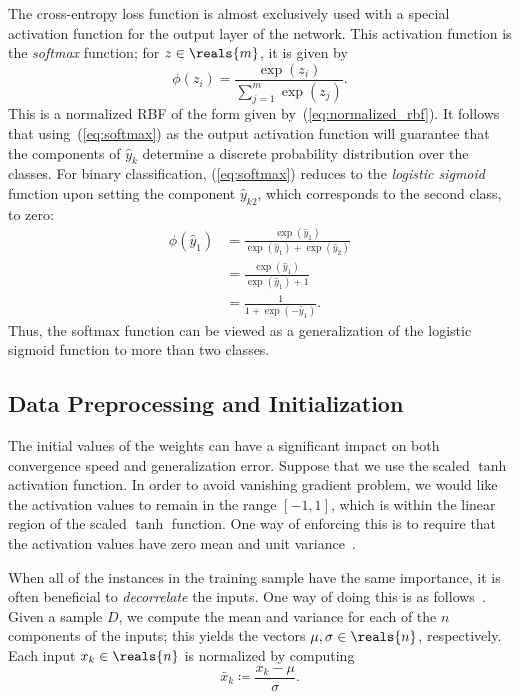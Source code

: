 \documentclass[11pt,a4paper]{article}
\numberwithin{equation}{section}
\begin{document}
The cross-entropy loss function is almost exclusively used with a special
activation function for the output layer of the network. This activation
function is the \emph{softmax} function; for $z \in \reals{m}$, it is given by
\begin{equation}
	\phi(z_i) = \frac{\exp(z_i)}{\sum_{j = 1}^m \exp(z_j)}.
	\label{eq:softmax}
\end{equation}
This is a normalized RBF of the form given by~(\ref{eq:normalized_rbf}). It
follows that using~(\ref{eq:softmax}) as the output activation function will
guarantee that the components of $\hat{y}_k$ determine a discrete probability
distribution over the classes. For binary classification, (\ref{eq:softmax})
reduces to the \emph{logistic sigmoid} function upon setting the component
$\hat{y}_{k2}$, which corresponds to the second class, to zero:
\begin{align*}
	\phi(\hat{y}_1)
	&= \frac{\exp(\hat{y}_1)}{\exp(\hat{y}_1) + \exp(\hat{y}_2)} \\
	&= \frac{\exp(\hat{y}_1)}{\exp(\hat{y}_1) + 1} \\
	&= \frac{1}{1 + \exp(-\hat{y}_1)}.
\end{align*}
Thus, the softmax function can be viewed as a generalization of the logistic
sigmoid function to more than two classes.

\subsection{Data Preprocessing and Initialization}

The initial values of the weights can have a significant impact on both
convergence speed and generalization error. Suppose that we use the scaled
$\tanh$ activation function. In order to avoid vanishing gradient problem, we
would like the activation values to remain in the range $[-1, 1]$, which is
within the linear region of the scaled $\tanh$ function. One way of enforcing
this is to require that the activation values have zero mean and unit
variance~\citep{lecun-98b}.

When all of the instances in the training sample have the same importance, it is
often beneficial to \emph{decorrelate} the inputs. One way of doing this is as
follows~\citep{lecun-98b}. Given a sample $D$, we compute the mean and variance
for each of the $n$ components of the inputs; this yields the vectors $\mu,
\sigma \in \reals{n}$, respectively. Each input $x_k \in \reals{n}$ is
normalized by computing
\[
	\bar{x}_k \coloneqq \frac{x_k - \mu}{\sigma}.
\]
\end{document}
